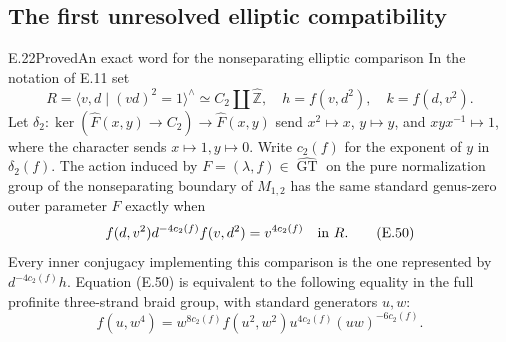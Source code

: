 \subsection{The first unresolved elliptic compatibility}
\begin{result}{E.22}{Proved}{An exact word for the nonseparating elliptic comparison}
In the notation of E.11 set
\[
 R=\langle v,d\mid(vd)^2=1\rangle^{\wedge}
       \simeq C_2\amalg\widehat{\mathbb Z},\quad
 h=f(v,d^2),\quad k=f(d,v^2).
\]
Let $\delta_2:\ker(\widehat F(x,y)\to C_2)\to
\widehat F(x,y)$ send $x^2\mapsto x$, $y\mapsto y$,
and $xyx^{-1}\mapsto1$, where the character sends
$x\mapsto1,y\mapsto0$.  Write $c_2(f)$ for the exponent
of $y$ in $\delta_2(f)$.  The action induced by
$F=(\lambda,f)\in\widehat{\operatorname{GT}}$ on the
pure normalization group of the nonseparating boundary
of $M_{1,2}$ has the same standard genus-zero outer
parameter $F$ exactly when
\[
 f(d,v^2)d^{-4c_2(f)}f(v,d^2)=v^{4c_2(f)}\quad\hbox{in }R.
                                                               \tag{E.50}
\]
Every inner conjugacy implementing this comparison is the
one represented by $d^{-4c_2(f)}h$.  Equation (E.50) is
equivalent to the following equality in the full profinite
three-strand braid group, with standard generators $u,w$:
\[
 f(u,w^4)=w^{8c_2(f)}f(u^2,w^2)u^{4c_2(f)}
                           (uw)^{-6c_2(f)}.                   \tag{E.51}
\]
\end{result}
